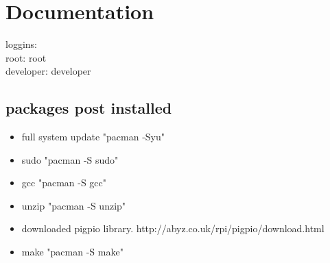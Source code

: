 \documentclass[12pt]{article}
\begin{document}
\section{Documentation}
loggins: \\
root: root\\
developer: developer\\
\subsection{packages post installed}
\begin{itemize}
\item full system update "pacman -Syu"
\item sudo "pacman -S sudo"
\item gcc "pacman -S gcc"
\item unzip "pacman -S unzip"
\item downloaded pigpio library. http://abyz.co.uk/rpi/pigpio/download.html
\item make "pacman -S make"
\end{itemize}
\end{document}
